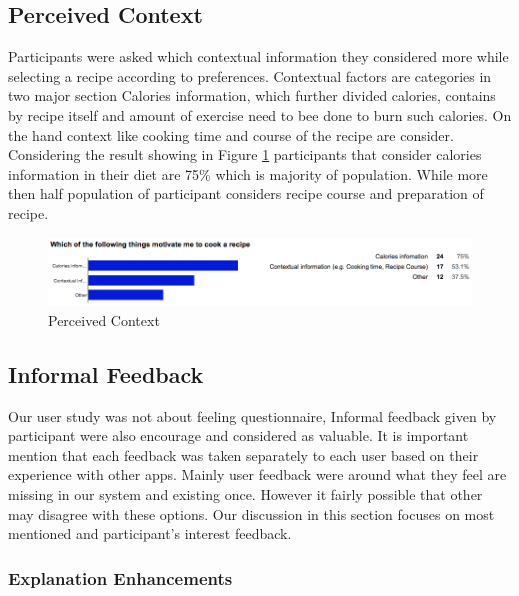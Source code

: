 \newpage
\subsection{Perceived Context}

Participants were asked which contextual information they considered more while selecting a recipe according to preferences. Contextual factors are categories in two major section Calories information, which further divided calories, contains by recipe itself and amount of exercise need to bee done to burn such calories. On the hand context like cooking time and course of the recipe are consider. Considering the result showing in Figure \ref{fig:ch5_stat_context} participants that consider calories information in their diet are 75\% which is majority of population. While more then half population of participant considers recipe course and preparation of recipe. 

\begin{figure}[h]
	\centering
	\includegraphics[width= 1\linewidth]{figures/ch5_stat_context}
	\caption{Perceived Context}
	\label{fig:ch5_stat_context}
\end{figure}

\subsection{Informal Feedback}

Our user study was not about feeling questionnaire, Informal feedback given by participant were also encourage and considered as valuable. It is important mention that each feedback was taken separately to each user based on their experience with other apps. Mainly user feedback were around what they feel are missing in our system and existing once. However it fairly possible that other may disagree with these options. Our discussion in this section focuses on most mentioned and participant’s interest feedback. \newline

\subsubsection{Explanation Enhancements}

